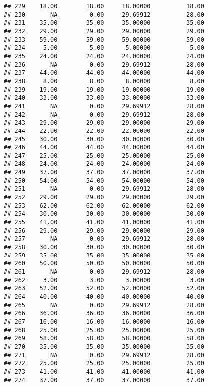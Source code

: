 \documentclass[
]{article}
\begin{document}
\begin{verbatim}
## 229    18.00        18.00     18.00000          18.00
## 230       NA         0.00     29.69912          28.00
## 231    35.00        35.00     35.00000          35.00
## 232    29.00        29.00     29.00000          29.00
## 233    59.00        59.00     59.00000          59.00
## 234     5.00         5.00      5.00000           5.00
## 235    24.00        24.00     24.00000          24.00
## 236       NA         0.00     29.69912          28.00
## 237    44.00        44.00     44.00000          44.00
## 238     8.00         8.00      8.00000           8.00
## 239    19.00        19.00     19.00000          19.00
## 240    33.00        33.00     33.00000          33.00
## 241       NA         0.00     29.69912          28.00
## 242       NA         0.00     29.69912          28.00
## 243    29.00        29.00     29.00000          29.00
## 244    22.00        22.00     22.00000          22.00
## 245    30.00        30.00     30.00000          30.00
## 246    44.00        44.00     44.00000          44.00
## 247    25.00        25.00     25.00000          25.00
## 248    24.00        24.00     24.00000          24.00
## 249    37.00        37.00     37.00000          37.00
## 250    54.00        54.00     54.00000          54.00
## 251       NA         0.00     29.69912          28.00
## 252    29.00        29.00     29.00000          29.00
## 253    62.00        62.00     62.00000          62.00
## 254    30.00        30.00     30.00000          30.00
## 255    41.00        41.00     41.00000          41.00
## 256    29.00        29.00     29.00000          29.00
## 257       NA         0.00     29.69912          28.00
## 258    30.00        30.00     30.00000          30.00
## 259    35.00        35.00     35.00000          35.00
## 260    50.00        50.00     50.00000          50.00
## 261       NA         0.00     29.69912          28.00
## 262     3.00         3.00      3.00000           3.00
## 263    52.00        52.00     52.00000          52.00
## 264    40.00        40.00     40.00000          40.00
## 265       NA         0.00     29.69912          28.00
## 266    36.00        36.00     36.00000          36.00
## 267    16.00        16.00     16.00000          16.00
## 268    25.00        25.00     25.00000          25.00
## 269    58.00        58.00     58.00000          58.00
## 270    35.00        35.00     35.00000          35.00
## 271       NA         0.00     29.69912          28.00
## 272    25.00        25.00     25.00000          25.00
## 273    41.00        41.00     41.00000          41.00
## 274    37.00        37.00     37.00000          37.00

\end{verbatim}
\end{document}
